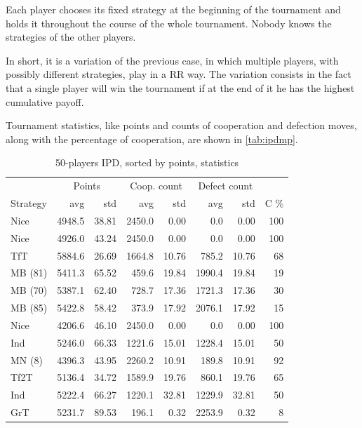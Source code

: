 \documentclass[journal,a4paper,10pt,twoside]{IEEEtran} %
\begin{document}
Each player chooses its fixed strategy at the beginning of the tournament and holds it throughout the course of the whole tournament. Nobody knows the strategies of the other players.

In short, it is a variation of the previous case, in which multiple players, with possibly different strategies, play in a RR way. The variation consists in the fact that a single player will win the tournament if at the end of it he has the highest cumulative payoff.

Tournament statistics, like points and counts of cooperation and defection moves, along with the percentage of cooperation, are shown in \autoref{tab:ipdmp}.

\begin{table}[ht]
    \caption{50-players IPD, sorted by points, statistics}
    \label{tab:ipdmp}
    \centering
    \begin{tabular}{lrrrrrrr} \toprule
    	         & \multicolumn{2}{c}{Points} & \multicolumn{2}{c}{Coop. count} & \multicolumn{2}{c}{Defect count} & \\
    	Strategy &      avg &   std &      avg &   std &      avg &   std &   C \% \\ \midrule
    	    Nice &   4948.5 & 38.81 &   2450.0 &  0.00 &      0.0 &  0.00 &   100 \\
    	    Nice &   4926.0 & 43.24 &   2450.0 &  0.00 &      0.0 &  0.00 &   100 \\
    	     TfT &   5884.6 & 26.69 &   1664.8 & 10.76 &    785.2 & 10.76 &    68 \\
    	 MB (81) &   5411.3 & 65.52 &    459.6 & 19.84 &   1990.4 & 19.84 &    19 \\
    	 MB (70) &   5387.1 & 62.40 &    728.7 & 17.36 &   1721.3 & 17.36 &    30 \\
    	 MB (85) &   5422.8 & 58.42 &    373.9 & 17.92 &   2076.1 & 17.92 &    15 \\
    	    Nice &   4206.6 & 46.10 &   2450.0 &  0.00 &      0.0 &  0.00 &   100 \\
    	     Ind &   5246.0 & 66.33 &   1221.6 & 15.01 &   1228.4 & 15.01 &    50 \\
    	  MN (8) &   4396.3 & 43.95 &   2260.2 & 10.91 &    189.8 & 10.91 &    92 \\
    	    Tf2T &   5136.4 & 34.72 &   1589.9 & 19.76 &    860.1 & 19.76 &    65 \\
    	     Ind &   5222.4 & 66.27 &   1220.1 & 32.81 &   1229.9 & 32.81 &    50 \\
    	     GrT &   5231.7 & 89.53 &    196.1 &  0.32 &   2253.9 &  0.32 &     8 \\

\end{tabular}
\end{table}
\end{document}
